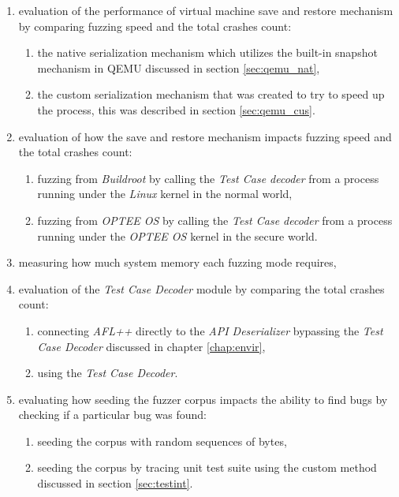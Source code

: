 \begin{enumerate}
    \item evaluation of the performance of virtual machine save and restore mechanism by comparing fuzzing speed and the total crashes count:
    \begin{enumerate}
        \item the native serialization mechanism which utilizes the built-in snapshot mechanism in QEMU discussed in section \ref{sec:qemu_nat},
        \item the custom serialization mechanism that was created to try to speed up the process, this was described in section \ref{sec:qemu_cus}.
    \end{enumerate}

    \item evaluation of how the save and restore mechanism impacts fuzzing speed and the total crashes count:
    \begin{enumerate}
        \item fuzzing from \textit{Buildroot} by calling the \textit{Test Case decoder} from a process running under the \textit{Linux} kernel in the normal world,
        \item fuzzing from \textit{OPTEE OS} by calling the \textit{Test Case decoder} from a process running under the \textit{OPTEE OS} kernel in the secure world.
    \end{enumerate}

    \item measuring how much system memory each fuzzing mode requires,

    \item evaluation of the \textit{Test Case Decoder} module by comparing the total crashes count:
    \begin{enumerate}
        \item connecting \textit{AFL++} directly to the \textit{API Deserializer} bypassing the \textit{Test Case Decoder} discussed in chapter \ref{chap:envir},
        \item using the \textit{Test Case Decoder}.
    \end{enumerate}

    \item evaluating how seeding the fuzzer corpus impacts the ability to find bugs by checking if a particular bug was found:
    \begin{enumerate}
        \item seeding the corpus with random sequences of bytes,
        \item seeding the corpus by tracing unit test suite using the custom method discussed in section \ref{sec:testint}.
    \end{enumerate}
\end{enumerate}

